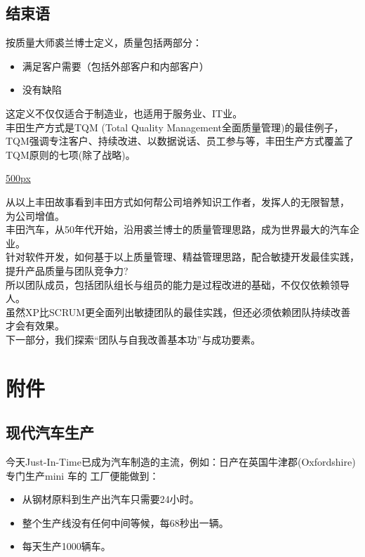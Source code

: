 \documentclass[]{article}
\providecommand{\tightlist}{%
  \setlength{\itemsep}{0pt}\setlength{\parskip}{0pt}}
\begin{document}
\hypertarget{ux7ed3ux675fux8bed}{%
\subsection{结束语}\label{ux7ed3ux675fux8bed}}

按质量大师裘兰博士定义，质量包括两部分：

\begin{itemize}
\tightlist
\item
  满足客户需要（包括外部客户和内部客户）
\item
  没有缺陷\\
\end{itemize}

这定义不仅仅适合于制造业，也适用于服务业、IT业。\\
丰田生产方式是TQM (Total Quality
Management全面质量管理)的最佳例子，TQM强调专注客户、持续改进、以数据说话、员工参与等，丰田生产方式覆盖了TQM原则的七项(除了战略)。

\href{文件:TQM_1.2.png}{500px}

从以上丰田故事看到丰田方式如何帮公司培养知识工作者，发挥人的无限智慧，
为公司增值。\\
丰田汽车，从50年代开始，沿用裘兰博士的质量管理思路，成为世界最大的汽车企业。\\
针对软件开发，如何基于以上质量管理、精益管理思路，配合敏捷开发最佳实践，提升产品质量与团队竞争力?\\
所以团队成员，包括团队组长与组员的能力是过程改进的基础，不仅仅依赖领导人。\\
虽然XP比SCRUM更全面列出敏捷团队的最佳实践，但还必须依赖团队持续改善才会有效果。\\
下一部分，我们探索``团队与自我改善基本功''与成功要素。

\hypertarget{ux9644ux4ef6}{%
\section{附件}\label{ux9644ux4ef6}}

\hypertarget{ux73b0ux4ee3ux6c7dux8f66ux751fux4ea7}{%
\subsection{现代汽车生产}\label{ux73b0ux4ee3ux6c7dux8f66ux751fux4ea7}}

今天Just-In-Time已成为汽车制造的主流，例如：日产在英国牛津郡(Oxfordshire)专门生产mini
车的 工厂便能做到：

\begin{itemize}
\tightlist
\item
  从钢材原料到生产出汽车只需要24小时。
\item
  整个生产线没有任何中间等候，每68秒出一辆。
\item
  每天生产1000辆车。
\end{itemize}
\end{document}
